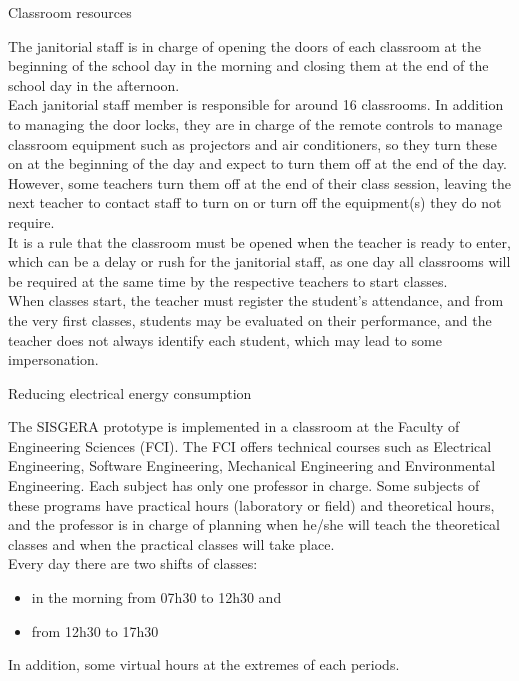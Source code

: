\documentclass[notes=show, 10pt]{beamer}
\begin{document}
    \begin{frame}{Classroom resources}
        \begin{block}{}
            The janitorial staff is in charge of opening the doors of each classroom at the beginning of the school day in the morning and closing them at the end of the school day in the afternoon.\\
            Each janitorial staff member is responsible for around 16 classrooms. In addition to managing the door locks, they are in charge of the remote controls to manage classroom equipment such as projectors and air conditioners, so they turn these on at the beginning of the day and expect to turn them off at the end of the day. However, some teachers turn them off at the end of their class session, leaving the next teacher to contact staff to turn on or turn off the equipment(s) they do not require.\\
            It is a rule that the classroom must be opened when the teacher is ready to enter, which can be a delay or rush for the janitorial staff, as one day all classrooms will be required at the same time by the respective teachers to start classes.\\
            When classes start, the teacher must register the student's attendance, and from the very first classes, students may be evaluated on their performance, and the teacher does not always identify each student, which may lead to some impersonation.
        \end{block}
    \end{frame}

    \begin{frame}{Reducing electrical energy consumption}
        \begin{block}{}
            The SISGERA prototype is implemented in a classroom at the Faculty of Engineering Sciences (FCI). The FCI offers technical courses such as Electrical Engineering, Software Engineering, Mechanical Engineering and Environmental Engineering. Each subject has only one professor in charge. Some subjects of these programs have practical hours (laboratory or field) and theoretical hours, and the professor is in charge of planning when he/she will teach the theoretical classes and when the practical classes will take place.\\
            Every day there are two shifts of classes:
            \begin{itemize}
                \item in the morning from 07h30 to 12h30 and 
                \item from 12h30 to 17h30
            \end{itemize}
            In addition, some virtual hours at the extremes of each periods.
        \end{block}
    \end{frame}
    
\end{document}
